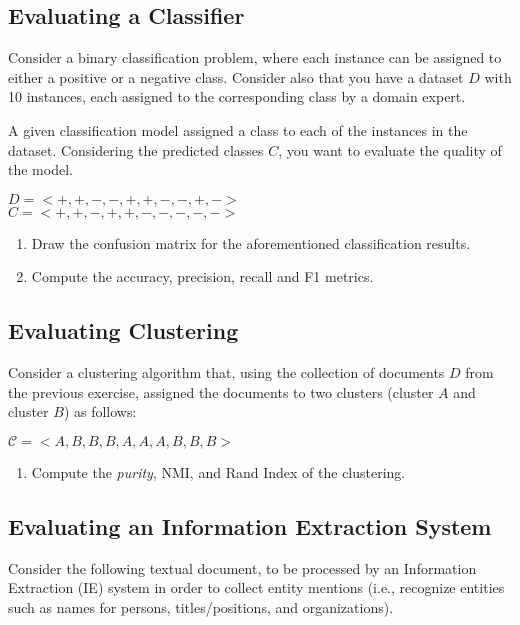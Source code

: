 \documentclass[12pt]{article}
\begin{document}
\subsection{Evaluating a Classifier}

Consider a binary classification problem, where each instance can be assigned to either a positive or a negative class. Consider also that you have a dataset $D$ with 10 instances, each assigned to the corresponding class by a domain expert. 

A given classification model assigned a class to each of the instances in the dataset. Considering the predicted classes $C$, you want to evaluate the quality of the model.

\begin{center}
$D = < + , + , - , - , + , + , - , - , + , - >$ \\
$C = < + , + , - , + , + , - , - , - , - , - >$
\end{center}

\begin{enumerate}
\item Draw the confusion matrix for the aforementioned classification results.
\item Compute the accuracy, precision, recall and F1 metrics.
\end{enumerate}

\subsection{Evaluating Clustering}

Consider a clustering algorithm that, using the collection of documents $D$ from the previous exercise, assigned the documents to two clusters (cluster $A$ and cluster $B$) as follows:

\begin{center}
    $\mathcal{C} = < A , B , B , B , A , A , A , B , B , B >$
\end{center}

\begin{enumerate}
\item Compute the \emph{purity}, NMI, and Rand Index of the clustering.
\end{enumerate}

\subsection{Evaluating an Information Extraction System}

Consider the following textual document, to be processed by an Information Extraction (IE) system in order to collect entity mentions (i.e., recognize entities such as names for persons, titles/positions, and organizations).
\end{document}
